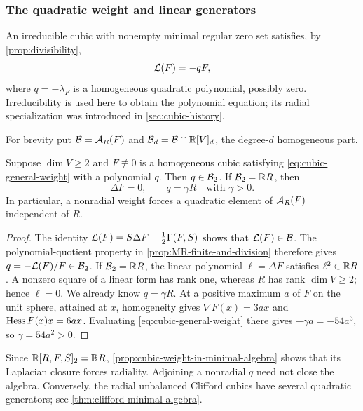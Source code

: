 \subsubsection{The quadratic weight and linear generators}

An irreducible cubic with nonempty minimal regular zero set satisfies,
by \cref{prop:divisibility},
\begin{equation}\label{eq:cubic-general-weight}
 \mathcal L(F)=-qF,
\end{equation}
where \(q=-\lambda_F\) is a homogeneous quadratic polynomial,
possibly zero. Irreducibility is used here to obtain the polynomial
equation; its radial specialization was introduced in
\cref{sec:cubic-history}.

For brevity put \(\mathcal B=\mathcal A_R(F)\) and
\(\mathcal B_d=\mathcal B\cap\mathbb R[V]_d\), the degree-\(d\) homogeneous part.

\begin{proposition}
\label{prop:cubic-weight-in-minimal-algebra}
Suppose \(\dim V\geq2\) and \(F\not\equiv0\) is a homogeneous
cubic satisfying \eqref{eq:cubic-general-weight} with a polynomial
\(q\). Then \(q\in\mathcal B_2\). If \(\mathcal B_2=\mathbb R R\), then
\[
 \Delta F=0,\qquad q=\gamma R\quad\text{with }\gamma>0.
\]
In particular, a nonradial weight forces a quadratic element of
\(\mathcal A_R(F)\) independent of \(R\).
\end{proposition}

\begin{proof}
The identity \(\mathcal L(F)=S\Delta F-\tfrac12\Gamma(F,S)\)
shows that \(\mathcal L(F)\in\mathcal B\). The polynomial-quotient property
in \cref{prop:MR-finite-and-division} therefore gives
\(q=-\mathcal L(F)/F\in\mathcal B_2\). If \(\mathcal B_2=\mathbb R R\), the linear
polynomial \(\ell=\Delta F\) satisfies \(\ell^2\in\mathbb R R\).
A nonzero square of a linear form has rank one, whereas \(R\)
has rank \(\dim V\geq2\); hence \(\ell=0\).
We already know \(q=\gamma R\). At a positive maximum \(a\) of
\(F\) on the unit sphere, attained at \(x\), homogeneity gives
\(\nabla F(x)=3ax\) and \(\operatorname{Hess} F(x)x=6ax\).
Evaluating \eqref{eq:cubic-general-weight} there gives
\(-\gamma a=-54a^3\), so \(\gamma=54a^2>0\).
\end{proof}

\begin{remark}
\label{rem:cubic-nonradial-closure}
Since \(\mathbb R[R,F,S]_2=\mathbb R R\),
\cref{prop:cubic-weight-in-minimal-algebra} shows that its Laplacian
closure forces radiality. Adjoining a nonradial \(q\) need not close
the algebra. Conversely, the radial unbalanced Clifford cubics have
several quadratic generators; see \cref{thm:clifford-minimal-algebra}.
\end{remark}

